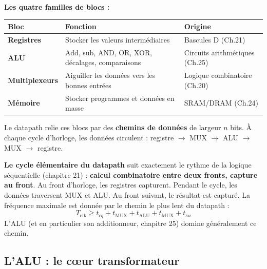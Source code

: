 \documentclass[12pt,a4paper,twoside]{book}
\begin{document}
\begin{formule}
\textbf{Les quatre familles de blocs :}

\begin{center}
\renewcommand{\arraystretch}{1.4}
\begin{tabular}{p{2.8cm}p{4.5cm}p{5.5cm}}
\toprule
\textbf{Bloc} & \textbf{Fonction} & \textbf{Origine} \\
\midrule
\textbf{Registres} & Stocker les valeurs intermédiaires & Bascules D (Ch.21) \\
\textbf{ALU} & Add, sub, AND, OR, XOR, décalages, comparaisons & Circuits arithmétiques (Ch.25) \\
\textbf{Multiplexeurs} & Aiguiller les données vers les bonnes entrées & Logique combinatoire (Ch.20) \\
\textbf{Mémoire} & Stocker programmes et données en masse & SRAM/DRAM (Ch.24) \\
\bottomrule
\end{tabular}
\end{center}

Le datapath relie ces blocs par des \textbf{chemins de données} de largeur $n$ bits. À chaque cycle d'horloge, les données circulent : registre $\to$ MUX $\to$ ALU $\to$ MUX $\to$ registre.
\end{formule}

\begin{attention}
\textbf{Le cycle élémentaire du datapath} suit exactement le rythme de la logique séquentielle (chapitre 21) : \textbf{calcul combinatoire entre deux fronts, capture au front}. Au front d'horloge, les registres capturent. Pendant le cycle, les données traversent MUX et ALU. Au front suivant, le résultat est capturé. La fréquence maximale est donnée par le chemin le plus lent du datapath :
\[
T_{\text{clk}} \geq t_{cq} + t_{\text{MUX}} + t_{\text{ALU}} + t_{\text{MUX}} + t_{su}
\]
L'ALU (et en particulier son additionneur, chapitre 25) domine généralement ce chemin.
\end{attention}

\subsection{L'ALU : le cœur transformateur}
\end{document}
